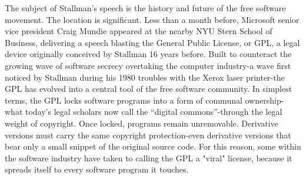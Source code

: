 \ifdefined\eng
\ifdefined\vone
The subject of Stallman's speech is the history and future of the free software movement. The location is significant. Less than a month before, Microsoft senior vice president Craig Mundie appeared at the nearby NYU Stern School of Business, delivering a speech blasting the General Public License, or GPL, a legal device originally conceived by Stallman 16 years before. Built to counteract the growing wave of software secrecy overtaking the computer industry-a wave first noticed by Stallman during his 1980 troubles with the Xerox laser printer-the GPL has evolved into a central tool of the free software community. In simplest terms, the GPL locks software programs into a form of communal ownership-what today's legal scholars now call the ``digital commons''-through the legal weight of copyright. Once locked, programs remain unremovable. Derivative versions must carry the same copyright protection-even derivative versions that bear only a small snippet of the original source code. For this reason, some within the software industry have taken to calling the GPL a "viral" license, because it spreads itself to every software program it touches.
\fi
\ifdefined\vtwo
